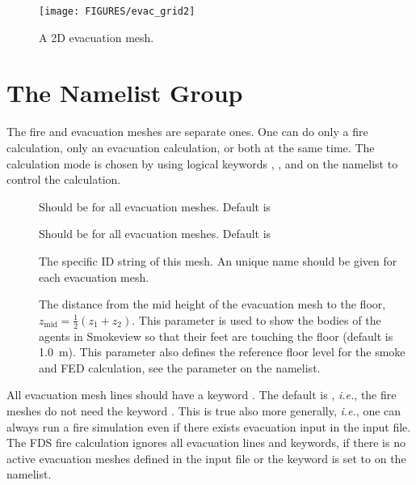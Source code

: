 \documentclass[12pt,a4paper,final,twoside]{stylevk}
\begin{document}
%
\begin{figure}[!tb]
  \centerline{\texttt{[image: FIGURES/evac\_grid2]}}
  \caption{A 2D evacuation mesh.}\label{Fig_EvacGrid} 
\end{figure}
%


\section{The  Namelist Group}\label{Sec_EvacGrid}

\noindent The fire and evacuation meshes are separate ones.  One can
do only a fire calculation, only an evacuation calculation, or both at
the same time.  The calculation mode is chosen by using logical
keywords , , and
 on the  namelist to control the
calculation.

\begin{description}
%
\item[] Should be  for all evacuation
  meshes.  Default is 
%
\item[] Should be  for all
  evacuation meshes.  Default is 
%
\item[] The specific ID string of this mesh.  An unique name
  should be given for each evacuation mesh.
%
\item[] The distance from the mid height of the
  evacuation mesh to the floor, $z_\mathrm{mid} = \frac{1}{2}
  (z_1+z_2)$.  This parameter is used to show the bodies of the agents
  in Smokeview so that their feet are touching the floor (default is
  1.0~m).  This parameter also defines the reference floor level for
  the smoke and FED calculation, see the parameter
   on the  namelist.
%
\end{description}

All evacuation mesh lines should have a keyword
.  The default is ,
\emph{i.e.}, the fire meshes do not need the keyword
.  This is true also more generally, \emph{i.e.},
one can always run a fire simulation even if there exists evacuation
input in the input file.  The FDS fire calculation ignores all
evacuation lines and keywords, if there is no active evacuation meshes
defined in the input file or the keyword  is set
to  on the  namelist.
\end{document}

